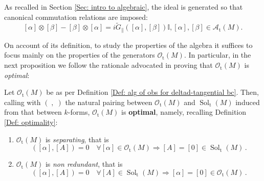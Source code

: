 As recalled in Section \ref{Sec: intro to algebraic}, the ideal is generated so that canonical commutation relations are imposed:
\[	[\alpha]\otimes[\beta]-[\beta]\otimes[\alpha]=i \widetilde{G}_\parallel([\alpha],[\beta])\mathbb{I},[\alpha],[\beta]\in \mathcal{A}_{\mathrm{t}}(M).	\]

On account of its definition, to study the properties of the algebra it suffices to focus mainly on the properties of the generators $\mathcal{O}_{\mathrm{t}}(M)$. In particular, in the next proposition we follow the rationale advocated in \cite{Benini-16} proving that $\mathcal{O}_{\mathrm{t}}(M)$ is {\em optimal}:

\begin{proposition}\label{Prop: sep and opt for the alg of obs with deltad-tangential bc}
	Let  $\mathcal{O}_{\mathrm{t}}(M)$ be as per Definition \ref{Def: alg of obs for deltad-tangential bc}.
	Then, calling with $(\;,\;)$ the natural pairing between $\mathcal{O}_{\mathrm{t}}(M)$ and $\operatorname{Sol}_{\mathrm{t}}(M)$ induced from that between $k$-forms, $\mathcal{O}_{\mathrm{t}}(M)$ is {\bf optimal}, namely, recalling Definition \ref{Def: optimality}:
	\begin{enumerate}
		\item  $\mathcal{O}_{\mathrm{t}}(M)$ is {\em separating}, that is
		\begin{equation}\label{Eqn: optimality for g-boundary condition algebra}
		([\alpha],[A])=0\quad\forall [\alpha]\in\mathcal{O}_{\mathrm{t}}(M)\Longrightarrow [A]=[0]\in\operatorname{Sol}_{\mathrm{t}}(M)\,.
		\end{equation}
		\item  $\mathcal{O}_{\mathrm{t}}(M)$ is {\em non redundant}, that is
		\begin{equation}\label{Eqn: separability for g-boundary condition algebra}
		([\alpha],[A])=0\quad\forall [A]\in\operatorname{Sol}_{\mathrm{t}}(M)\Longrightarrow[\alpha]=[0]\in\mathcal{O}_{\mathrm{t}}(M)\,.
		\end{equation}
	\end{enumerate}
\end{proposition}

